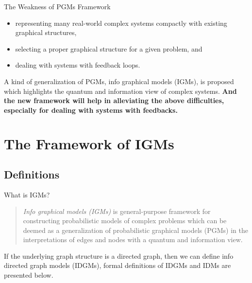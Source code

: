 \documentclass[10pt]{beamer}
\begin{document}
\begin{CJK*}{UTF8}{gbsn}
\begin{frame}{The Weakness of PGMs Framework}
    \begin{itemize}
        \item representing many real-world complex systems compactly with existing graphical structures, 
        \item selecting a proper graphical structure for a given problem, and
        \item dealing with systems with feedback loops\cite{bongers2016theoretical}.
    \end{itemize}
    
    A kind of generalization of PGMs,  info graphical models (IGMs), is proposed which highlights the quantum and information view of complex systems. \textbf{And the new framework will help in alleviating the above difficulties, especially for dealing with systems with feedbacks.}   
    
\end{frame}

\section[IGMs]{The Framework of IGMs}

\subsection{Definitions}

\begin{frame}{What is IGMs?}
    \begin{quote}
    \emph{Info graphical models (IGMs)} is general-purpose framework for constructing probabilistic models of complex problems which can be deemed as a generalization of probabilistic graphical models (PGMs) in the interpretations of edges and nodes with a quantum and information view.        
    \end{quote}
 
    
    If the underlying graph structure is a directed graph, then we can define info directed graph models (IDGMs), formal definitions of IDGMs and IDMs are presented below. 
    
\end{frame}


\end{CJK*}
\end{document}
